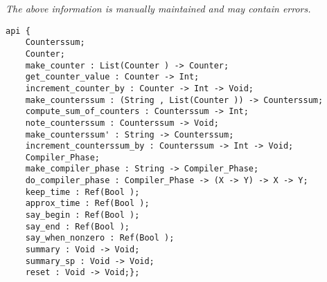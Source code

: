 \label{api:Compile\_Statistics}

{\tiny \it The above information is manually maintained and may contain errors.}
\begin{verbatim}
api {
    Counterssum;
    Counter;
    make_counter : List(Counter ) -> Counter;
    get_counter_value : Counter -> Int;
    increment_counter_by : Counter -> Int -> Void;
    make_counterssum : (String , List(Counter )) -> Counterssum;
    compute_sum_of_counters : Counterssum -> Int;
    note_counterssum : Counterssum -> Void;
    make_counterssum' : String -> Counterssum;
    increment_counterssum_by : Counterssum -> Int -> Void;
    Compiler_Phase;
    make_compiler_phase : String -> Compiler_Phase;
    do_compiler_phase : Compiler_Phase -> (X -> Y) -> X -> Y;
    keep_time : Ref(Bool );
    approx_time : Ref(Bool );
    say_begin : Ref(Bool );
    say_end : Ref(Bool );
    say_when_nonzero : Ref(Bool );
    summary : Void -> Void;
    summary_sp : Void -> Void;
    reset : Void -> Void;};
\end{verbatim}
